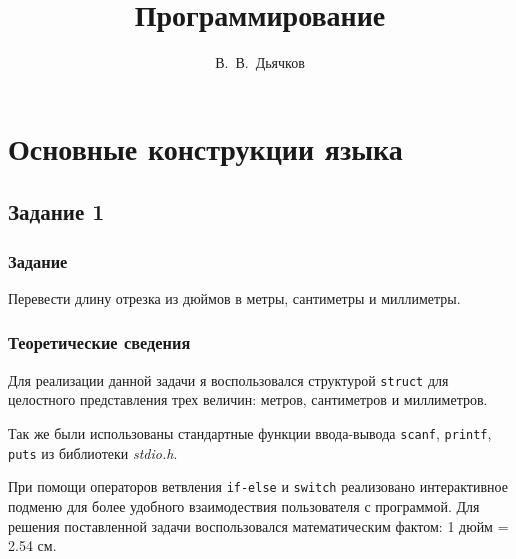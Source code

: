 \documentclass[12pt,a4paper]{report}
\author{В.~В.~Дьячков}
\title{Программирование}
\begin{document}
\listoftodos
\maketitle
\chapter{Основные конструкции языка}
\section{Задание 1}
\subsection{Задание}

Перевести длину отрезка из дюймов в метры, сантиметры и миллиметры.

\subsection{Теоретические сведения}
\hspace{\parindent}Для реализации данной задачи я воспользовался структурой \texttt{struct} для целостного представления трех величин: метров, сантиметров и миллиметров. 

Так же были использованы стандартные функции ввода-вывода \texttt{scanf}, \texttt{printf},
\texttt{puts} из библиотеки \textit{stdio.h}.

При помощи операторов ветвления \texttt{if-else} и \texttt{switch} реализовано интерактивное подменю для более удобного взаимодествия пользователя с программой.
Для решения поставленной задачи воспользовался математическим фактом: 1 дюйм = 2.54 см.
\end{document}
